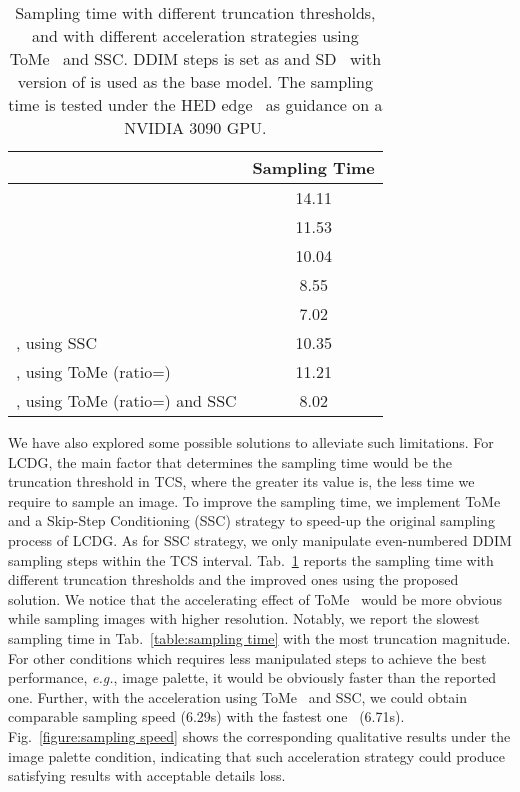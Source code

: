 \documentclass{article}
\begin{document}
\begin{table}[h]
  \centering
\caption{Sampling time with different truncation thresholds, and with different acceleration strategies using ToMe~\cite{bolya2022token} and SSC. DDIM steps is set as  and SD~\cite{rombach2022high} with version of  is used as the base model. The sampling time is tested under the HED edge~\cite{xie2015holistically} as guidance on a NVIDIA 3090 GPU.}
\begin{tabular}{lc}
   \toprule
   &Sampling Time\\
   \midrule 
       & 14.11 \\
       & 11.53 \\
       & 10.04 \\
       & 8.55 \\
       & 7.02 \\
   \midrule
   , using SSC    & 10.35 \\
   , using ToMe (ratio=)    & 11.21 \\
   , using ToMe (ratio=) and SSC    & 8.02 \\
\bottomrule
\end{tabular}
  \label{table:sampling time with acceleration}
\end{table}


We have also explored some possible solutions to alleviate such limitations. For LCDG, the main factor that determines the sampling time would be the truncation threshold in TCS, where the greater its value is, the less time we require to sample an image. To improve the sampling time, we implement ToMe~\cite{bolya2022token} and a Skip-Step Conditioning (SSC) strategy to speed-up the original sampling process of LCDG. As for SSC strategy, we only manipulate even-numbered DDIM sampling steps within the TCS interval. Tab.~\ref{table:sampling time with acceleration} reports the sampling time with different truncation thresholds and the improved ones using the proposed solution. We notice that the accelerating effect of ToMe~\cite{bolya2022token} would be more obvious while sampling images with higher resolution. Notably, we report the slowest sampling time in Tab.~\ref{table:sampling time} with the most truncation magnitude. For other conditions which requires less manipulated steps to achieve the best performance, \textit{e.g.}, image palette, it would be obviously faster than the reported one. Further, with the acceleration using ToMe~\cite{bolya2022token} and SSC, we could obtain comparable sampling speed (6.29s) with the fastest one~\cite{mou2023t2i} (6.71s). Fig.~\ref{figure:sampling speed} shows the corresponding qualitative results under the image palette condition, indicating that such acceleration strategy could produce satisfying results with acceptable details loss.
\end{document}
